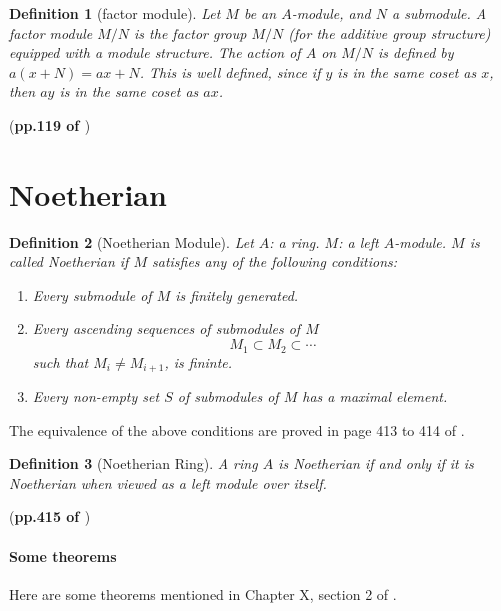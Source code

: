 \documentclass{article}
\numberwithin{equation}{subsection} %
\newtheorem{defi}{Definition}[section]
\theoremstyle{definition}
\begin{document}
\begin{defi}[factor module]
    Let $M$ be an $A$-module, and $N$ a submodule. 
    A factor module $M/N$ is the factor group $M/N$ (for the
    additive group structure) equipped with a module structure.
    The action of $A$ on $M/N$ is defined by $a(x+N) = ax+N$.
    This is well defined, since if $y$ is in the same coset as
    $x$, then $ay$ is in the same coset as $ax$.
\end{defi}
(\textbf{pp.119 of \cite{lang}})

\section{Noetherian}
\label{sec:Noetherian}
\begin{defi}[Noetherian Module]
    Let $A$: a ring. $M$: a left $A$-module. $M$ is called Noetherian
    if $M$ satisfies any of the following conditions:
    \begin{enumerate}
        \item Every submodule of $M$ is finitely generated.
        \item Every ascending sequences of submodules of $M$
            \[ M_1 \subset M_2 \subset \cdots \]
            such that $M_i \neq M_{i+1}$, is fininte.
        \item Every non-empty set $S$ of submodules of $M$ has a maximal
            element.
    \end{enumerate}
\end{defi}

The equivalence of the above conditions are proved in page 413 to 414 of 
\cite{lang}.

\begin{defi}[Noetherian Ring]
    A ring $A$ is Noetherian if and only if it is Noetherian when
    viewed as a left module over itself.
\end{defi}
(\textbf{pp.415 of \cite{lang}})

\paragraph{Some theorems} 

Here are some theorems mentioned in Chapter X,
section 2 of \cite{lang}.
\end{document}
